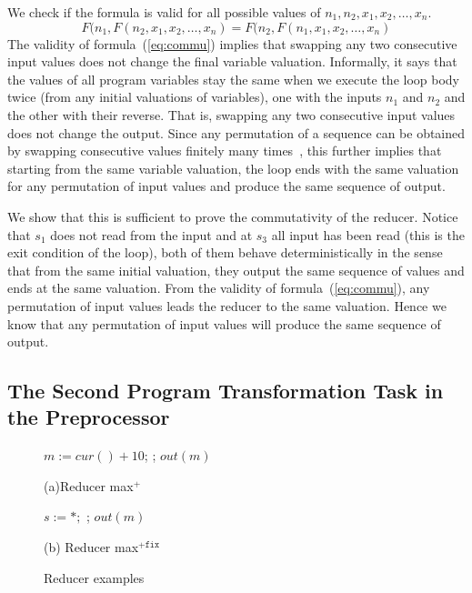 \documentclass{llncs}
\newcommand{\cur}{cur()}
\begin{document}
We check if the formula is valid for all possible values of $n_1,n_2, x_1,x_2,\ldots,x_n$.
\begin{equation}
 F(n_1, F(n_2,x_1,x_2,\ldots,x_n) = F(n_2, F(n_1,x_1,x_2,\ldots,x_n) 
\label{eq:commu}
\end{equation}
The validity of formula~(\ref{eq:commu}) implies that swapping any two consecutive input values does not change the final variable valuation. Informally, it says that the values of all program variables stay the same when we execute the loop body twice (from any initial valuations of variables), one with the inputs $n_1$ and $n_2$ and the other with their reverse. That is, swapping any two consecutive input values does not change the output. 
Since any permutation of a sequence can be obtained by swapping consecutive values finitely many times~\cite{algebra}, this further implies that starting from the same variable valuation, the loop ends with the same valuation for any permutation of input values and produce the same sequence of output.

We show that this is sufficient to prove the commutativity of the reducer. Notice that $s_1$ does not read from the input and at $s_3$ all input has been read (this is the exit condition of the loop), both of them behave deterministically in the sense that from the same initial valuation, they output the same sequence of values and ends at the same valuation. From the validity of formula~(\ref{eq:commu}), any permutation of input values leads the reducer to the same valuation. Hence we know that any permutation of input values will produce the same sequence of output.

\subsection{The Second Program Transformation Task in the Preprocessor}
\label{sec:program_trans2}




\begin{figure}[t]
	\begin{minipage}{0.4\textwidth}
		\begin{algorithm}[H]
			$m := \cur + 10$; \;
			\Loop{}{
				\uIf{ $\cur > m$}{
					$m := \cur$ \;
				}
			};
			$out(m)$
		\end{algorithm}
		\caption*{(a)Reducer max$^+$}
	\end{minipage}
		\begin{minipage}{0.6\textwidth}
			\begin{algorithm}[H]
				$s:=*;$\;
				\Loop{}{
					\uIf{$s=1$}{$m := \cur + 10; s:= 2$}
					\uElseIf{ $\cur > m$}{
						$m := \cur$ \;
					}
				};
				$out(m)$
			\end{algorithm}
			\caption*{(b) Reducer max$^{+\mathtt{fix}}$}
		\end{minipage}
	\caption{Reducer examples}
	\label{fig:reducer_max}
\end{figure}
\end{document}
